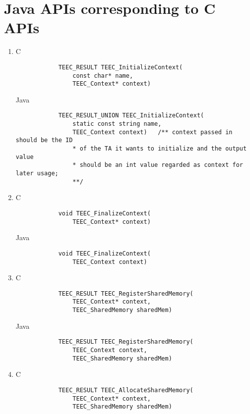 \documentclass{cseminar}
\begin{document}
\section{Java APIs corresponding to C APIs}
\begin{enumerate}


	\item C
			\begin{lstlisting}
			TEEC_RESULT TEEC_InitializeContext(
				const char* name,
				TEEC_Context* context)
			\end{lstlisting}
		  
		  Java
		  	\begin{lstlisting}
		  	TEEC_RESULT_UNION TEEC_InitializeContext(
				static const string name,
				TEEC_Context context)	/** context passed in should be the ID 
				* of the TA it wants to initialize and the output value
				* should be an int value regarded as context for later usage;
				**/
			\end{lstlisting}


	\item C
			\begin{lstlisting}
			void TEEC_FinalizeContext(
				TEEC_Context* context)
			\end{lstlisting}
		  
		  Java
		  	\begin{lstlisting}
		  	void TEEC_FinalizeContext(
				TEEC_Context context)
			\end{lstlisting}


	\item C
			\begin{lstlisting}
			TEEC_RESULT TEEC_RegisterSharedMemory(
				TEEC_Context* context,
				TEEC_SharedMemory sharedMem)
			\end{lstlisting}
		  
		  Java
		  	\begin{lstlisting}
		  	TEEC_RESULT TEEC_RegisterSharedMemory(
				TEEC_Context context,
				TEEC_SharedMemory sharedMem)
			\end{lstlisting}


	\item C
			\begin{lstlisting}
			TEEC_RESULT TEEC_AllocateSharedMemory(
				TEEC_Context* context,
				TEEC_SharedMemory sharedMem)
			\end{lstlisting}
		  

\end{enumerate}
\end{document}

